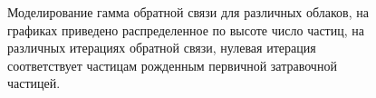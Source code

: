 \begin{figure}[ph!]
    \begin{center}
        \begin{minipage}[h]{0.49\linewidth}
        \end{minipage}
        \hfill
        \begin{minipage}[h]{0.49\linewidth}
        \end{minipage}
        \vfill
        \begin{minipage}[h]{0.49\linewidth}
        \end{minipage}
        \hfill
        \begin{minipage}[h]{0.49\linewidth}
        \end{minipage}
        \vfill
        \begin{minipage}[h]{0.49\linewidth}
        \end{minipage}
        \caption{Моделирование гамма обратной связи для различных облаков, на графиках приведено распределенное по высоте число частиц, на различных итерациях обратной связи, нулевая итерация соответствует частицам рожденным первичной затравочной частицей.}
    \end{center}
    \label{fig:storm:vertical_gamma}
\end{figure}


